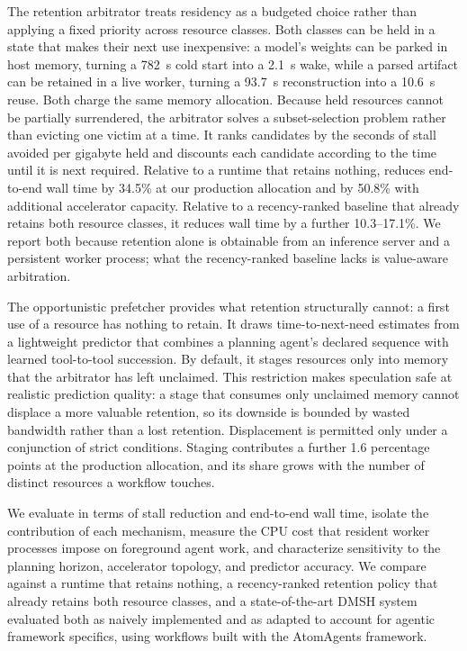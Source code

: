 The retention arbitrator treats residency as a budgeted choice rather than
applying a fixed priority across resource classes. Both classes can be held in
a state that makes their next use inexpensive: a model's weights can be parked
in host memory, turning a 782~s cold start into a 2.1~s wake, while a parsed
artifact can be retained in a live worker, turning a 93.7~s reconstruction
into a 10.6~s reuse. Both charge the same memory allocation. Because held
resources cannot be partially surrendered, the arbitrator solves a
subset-selection problem rather than evicting one victim at a time. It ranks
candidates by the seconds of stall avoided per gigabyte held and discounts
each candidate according to the time until it is next required. Relative to a
runtime that retains nothing, \sysname reduces end-to-end wall time by 34.5\%
at our production allocation and by 50.8\% with additional accelerator
capacity. Relative to a recency-ranked baseline that already retains both
resource classes, it reduces wall time by a further 10.3--17.1\%. We report
both because retention alone is obtainable from an inference server and a
persistent worker process; what the recency-ranked baseline lacks is
value-aware arbitration.

The opportunistic prefetcher provides what retention structurally cannot: a
first use of a resource has nothing to retain. It draws time-to-next-need
estimates from a lightweight predictor that combines a planning agent's
declared sequence with learned tool-to-tool succession. By default, it stages
resources only into memory that the arbitrator has left unclaimed. This
restriction makes speculation safe at realistic prediction quality: a stage
that consumes only unclaimed memory cannot displace a more valuable retention,
so its downside is bounded by wasted bandwidth rather than a lost retention.
Displacement is permitted only under a conjunction of strict conditions.
Staging contributes a further 1.6 percentage points at the production
allocation, and its share grows with the number of distinct resources a
workflow touches.

We evaluate \sysname in terms of stall reduction and end-to-end wall time,
isolate the contribution of each mechanism, measure the CPU cost that resident
worker processes impose on foreground agent work, and characterize sensitivity
to the planning horizon, accelerator topology, and predictor accuracy. We
compare against a runtime that retains nothing, a recency-ranked retention
policy that already retains both resource classes, and a state-of-the-art DMSH
system evaluated both as naively implemented and as adapted to account for
agentic framework specifics, using workflows built with the AtomAgents
framework.

